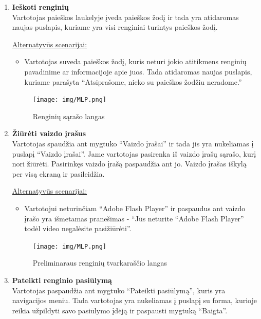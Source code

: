 \documentclass{VUMIFPSkursinis}
\begin{document}
\begin{enumerate} [label = \textbf{U\arabic*.}]
				\begin{figure}[H]
						\centering
						\texttt{[image: img/MLP.png]}
						\caption{Prisijungimo langas}
						\label{fig:prisijungimo-langas}
					\end{figure}

			\item \textbf{Ieškoti renginių} \\
					Vartotojas paieškos laukelyje įveda paieškos žodį ir tada yra atidaromas naujas puslapis, kuriame yra visi renginiai turintys paieškos žodį.
					
				\underline{Alternatyvūs scenarijai:}
				\begin{itemize}
						\item Vartotojas suveda paieškos žodį, kuris neturi jokio atitikmens renginių pavadinime ar informacijoje apie juos. Tada atidaromas naujas puslapis, kuriame parašyta “Atsiprašome, nieko su paieškos žodžiu neradome.” 
				\end{itemize}

				\begin{figure}[H]
					\centering
					\texttt{[image: img/MLP.png]}
					\caption{Renginių sąrašo langas}
					\label{fig:uzd_perziureti-vyksianciu-renginiu-sarasa}
				\end{figure}
				
			\item \textbf{Žiūrėti vaizdo įrašus} \\
				Vartotojas spaudžia ant mygtuko “Vaizdo įrašai” ir tada jis yra nukeliamas į puslapį “Vaizdo įrašai”. Jame vartotojas pasirenka iš vaizdo įrašų sąrašo, kurį nori žiūrėti. Pasirinkęs vaizdo įrašą paspaudžia ant jo. Vaizdo įrašas iškylą per visą ekraną ir pasileidžia.
				
				\underline{Alternatyvūs scenarijai:}
				\begin{itemize}
					\item Vartotojui neturinčiam “Adobe Flash Player” ir paspaudus ant vaizdo įrašo yra išmetamas pranešimas - “Jūs neturite “Adobe Flash Player” todėl video negalėsite pasižiūrėti”.
				\end{itemize}

				\begin{figure}[H]
					\centering
					\texttt{[image: img/MLP.png]}
					\caption{Preliminaraus renginių tvarkaraščio langas}
					\label{fig:prelim-tvark-langas}
				\end{figure}
				
			\item \textbf{Pateikti renginio pasiūlymą} \\
					Vartotojas paspaudžia ant mygtuko “Pateikti pasiūlymą”, kuris yra navigacijos meniu. Tada vartotojas yra nukeliamas į puslapį su forma, kurioje reikia užpildyti savo pasiūlymo įdėją ir paspausti mygtuką “Baigta”.
							

\end{enumerate}
\end{document}
